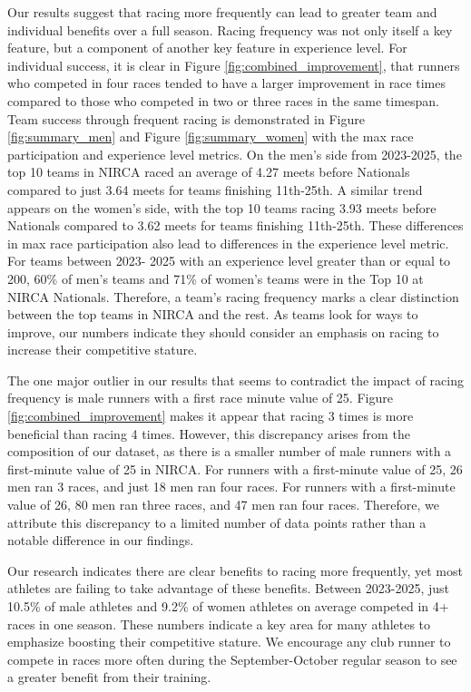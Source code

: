 \documentclass[suppldata]{interact}
\theoremstyle{plain}%
\theoremstyle{definition}
\theoremstyle{remark}
\begin{document}
Our results suggest that racing more frequently can lead to greater team and individual benefits over a full season. Racing frequency was not only itself a key feature, but a component of another key feature in experience level. For individual success, it is clear in Figure \ref{fig:combined_improvement}, that runners who competed in four races tended to have a larger improvement in race times compared to those who competed in two or three races in the same timespan. Team success through frequent racing is demonstrated in Figure \ref{fig:summary_men} and Figure \ref{fig:summary_women} with the max race participation and experience level metrics. On the men's side from 2023-2025, the top 10 teams in NIRCA raced an average of 4.27 meets before Nationals compared to just 3.64 meets for teams finishing 11th-25th.  A similar trend appears on the women's side, with the top 10 teams racing 3.93 meets before Nationals compared to 3.62 meets for teams finishing 11th-25th. These differences in max race participation also lead to differences in the experience level metric. For teams between 2023- 2025 with an experience level greater than or equal to 200, 60\% of men's teams and 71\% of women's teams were in the Top 10 at NIRCA Nationals. Therefore, a team's racing frequency marks a clear distinction between the top teams in NIRCA and the rest. As teams look for ways to improve, our numbers indicate they should consider an emphasis on racing to increase their competitive stature.

The one major outlier in our results that seems to contradict the impact of racing frequency is male runners with a first race minute value of 25. Figure \ref{fig:combined_improvement} makes it appear that racing 3 times is more beneficial than racing 4 times. However, this discrepancy arises from the composition of our dataset, as there is a smaller number of male runners with a first-minute value of 25 in NIRCA. For runners with a first-minute value of 25, 26 men ran 3 races, and just 18 men ran four races. For runners with a first-minute value of 26, 80 men ran three races, and 47 men ran four races. Therefore, we attribute this discrepancy to a limited number of data points rather than a notable difference in our findings. 

Our research indicates there are clear benefits to racing more frequently, yet most athletes are failing to take advantage of these benefits. Between 2023-2025, just 10.5\% of male athletes and 9.2\% of women athletes on average competed in 4+ races in one season. These numbers indicate a key area for many athletes to emphasize boosting their competitive stature. We encourage any club runner to compete in races more often during the September-October regular season to see a greater benefit from their training.
\end{document}
